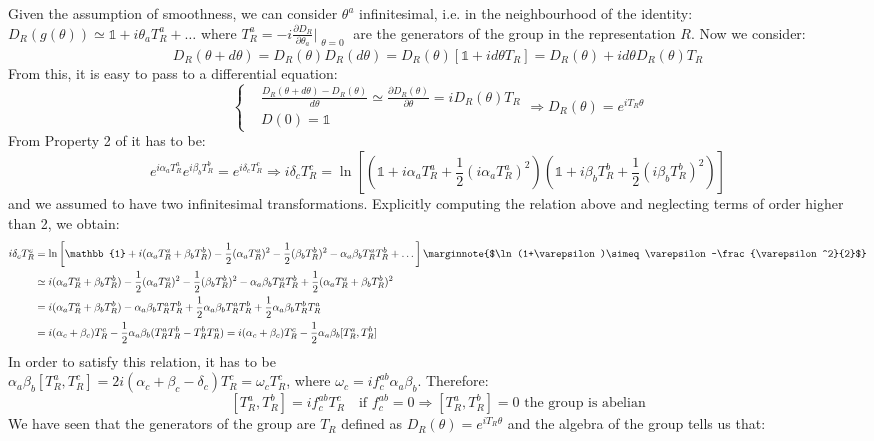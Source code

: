 \documentclass[../main.tex]{subfiles}
\begin{document}
Given the assumption of smoothness, we can consider $\theta^a$ infinitesimal, i.e. in the neighbourhood of the identity: $D_R(g(\theta))\simeq\mathbb{1}+i\theta_aT^a_R+\dots$ where $T_R^a=-i\frac{\partial D_R}{\partial\theta_a}\Bigr|_{\substack{\theta=0}}$ are the generators of the group in the representation $R$. Now we consider:
\[
D_R(\theta+d\theta)=D_R(\theta)D_R(d\theta)=D_R(\theta)[\mathbb{1}+id\theta T_R]=D_R(\theta)+id\theta D_R(\theta)T_R
\]
From this, it is easy to pass to a differential equation:
\[
\left\{
\begin{aligned}
&\frac{D_R(\theta+d\theta)-D_R(\theta)}{d\theta}\simeq\frac{\partial D_R(\theta)}{\partial\theta}=iD_R(\theta)T_R\\
&D(0)=\mathbb{1}
\end{aligned}
\right.
\Rightarrow D_R(\theta)=e^{iT_R\theta}
\]
From Property 2 of  it has to be:
\[
e^{i\alpha_aT_R^a}e^{i\beta_bT_R^b}=e^{i\delta_cT_R^c}\Rightarrow i\delta_cT_R^c=\ln\left[\left(\mathbb{1}+i\alpha_aT_R^a+\frac{1}{2}(i\alpha_aT_R^a)^2\right)\left(\mathbb{1}+i\beta_bT_R^b+\frac{1}{2}(i\beta_bT_R^b)^2\right)\right]
\]
and we assumed to have two infinitesimal transformations. Explicitly computing the relation above and neglecting terms of order higher than 2, we obtain:
\begin{align*}
    i\delta_cT_R^c&=\ln\left[\mathbb{1}+i(\alpha_aT_R^a+\beta_bT_R^b)-\frac{1}{2}(\alpha_aT_R^a)^2-\frac{1}{2}(\beta_bT_R^b)^2-\alpha_a\beta_bT_R^aT_R^b+\dots\right]\marginnote{$\ln(1+\varepsilon)\simeq\varepsilon-\frac{\varepsilon^2}{2}$}\\
    &\simeq i(\alpha_aT_R^a+\beta_bT_R^b)-\frac{1}{2}(\alpha_aT_R^a)^2-\frac{1}{2}(\beta_bT_R^b)^2-\alpha_a\beta_bT_R^aT_R^b+\frac{1}{2}(\alpha_aT_R^a+\beta_bT_R^b)^2\\
    &=i(\alpha_aT_R^a+\beta_bT_R^b)-\alpha_a\beta_bT_R^aT_R^b+\frac{1}{2}\alpha_a\beta_bT_R^aT_R^b+\frac{1}{2}\alpha_a\beta_bT_R^bT_R^a\\
    &=i(\alpha_c+\beta_c)T_R^c-\frac{1}{2}\alpha_a\beta_b(T_R^aT_R^b-T_R^bT_R^a)=i(\alpha_c+\beta_c)T_R^c-\frac{1}{2}\alpha_a\beta_b[T_R^a,T_R^b]
\end{align*}
In order to satisfy this relation, it has to be\\ $\alpha_a\beta_b[T_R^a,T_R^c]=2i(\alpha_c+\beta_c-\delta_c)T_R^c=\omega_cT_R^c$, where $\omega_c=if_c^{ab}\alpha_a\beta_b$. Therefore:
\[
[T_R^a,T_R^b]=if^{ab}_cT_R^c \quad \text{if } f^{ab}_c=0\Rightarrow[T_R^a,T_R^b]=0 \text{ the group is abelian}
\]
We have seen that the generators of the group are $T_R$ defined as $D_R(\theta)=e^{iT_R\theta}$ and the algebra of the group tells us that:
\end{document}
